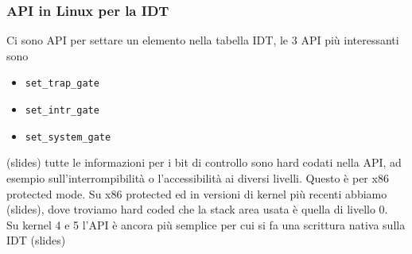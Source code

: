 \documentclass[12pt, oneside]{extbook}
\begin{document}
\subsubsection{API in Linux per la IDT}
Ci sono API per settare un elemento nella tabella IDT, le 3 API più interessanti sono
\begin{itemize}
\item \texttt{set\_trap\_gate}
\item \texttt{set\_intr\_gate}
\item \texttt{set\_system\_gate}
\end{itemize}
(slides) tutte le informazioni per i bit di controllo sono hard codati nella API, ad esempio sull'interrompibilità o l'accessibilità ai diversi livelli. Questo è per x86 protected mode.
Su x86 protected ed in versioni di kernel più recenti abbiamo (slides), dove troviamo hard coded che la stack area usata è quella di livello 0.\\Su kernel 4 e 5 l'API è ancora più semplice per cui si fa una scrittura nativa sulla IDT (slides)
\end{document}
